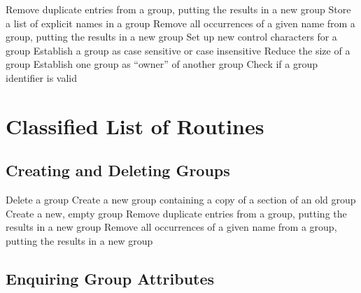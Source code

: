             {Remove duplicate entries from a group, putting the results in a new
group}
            {Store a list of explicit names in a group}
            {Remove all occurrences of a given name from a group, putting the results in a new group}
            {Set up new control characters for a group}
            {Establish a group as case sensitive or case insensitive}
            {Reduce the size of a group}
            {Establish one group as ``owner'' of another group}
            {Check if a group identifier is valid}

\section{Classified List of Routines}

\subsection{Creating and Deleting Groups}

            {Delete a group}
            {Create a new group containing a copy of a section of an old group}
            {Create a new, empty group}
            {Remove duplicate entries from a group, putting the results in a new
group}
            {Remove all occurrences of a given name from a group, putting the results in a new group}

\subsection{Enquiring Group Attributes}

